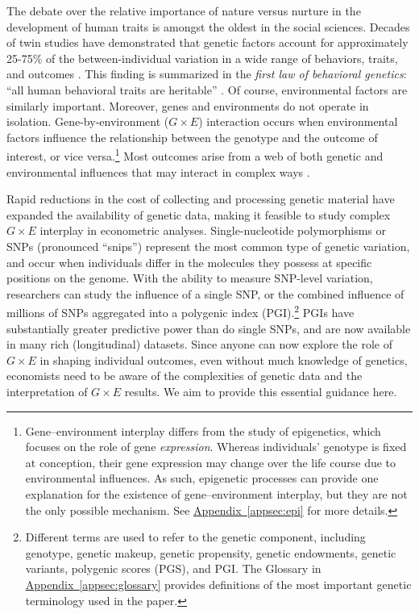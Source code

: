 \documentclass[12pt,a4paper]{article}
\begin{document}
\begin{bibunit}
The debate over the relative importance of nature versus nurture in the development of human traits is amongst the oldest in the social sciences. Decades of twin studies have demonstrated that genetic factors account for approximately 25-75\% of the between-individual variation in a wide range of behaviors, traits, and outcomes \citep{Polderman2015}.  This finding is summarized in the \textit{first law of behavioral genetics}: ``all human behavioral traits are heritable'' \citep{Turkheimer2000}. Of course, environmental factors are similarly important.  Moreover, genes and environments do not operate in isolation.  Gene-by-environment ($G \times E$) interaction occurs when environmental factors influence the relationship between the genotype and the outcome of interest, or vice versa.\footnote{Gene--environment interplay differs from the study of epigenetics, which focuses on the role of gene \textit{expression}. Whereas individuals' genotype is fixed at conception, their gene expression may change over the life course due to environmental influences. As such, epigenetic processes can provide one explanation for the existence of gene--environment interplay, but they are not the only possible mechanism. See \hyperref[appsec:epi]{Appendix~\ref*{appsec:epi}} for more details.}    Most outcomes arise from a web of both genetic and environmental influences that may interact in complex ways \citep{Hunter2005, Heckman2007}.

Rapid reductions in the cost of collecting and processing genetic material have expanded the availability of genetic data, making it feasible to study complex $G \times E$ interplay in econometric analyses.  Single-nucleotide polymorphisms or SNPs (pronounced ``snips'') represent the most common type of genetic variation, and occur when individuals differ in the molecules they possess at specific positions on the genome.  With the ability to measure SNP-level variation, researchers can study the influence of a single SNP, or the combined influence of millions of SNPs aggregated into a polygenic index (PGI).\footnote{Different terms are used to refer to the genetic component, including genotype, genetic makeup, genetic propensity, genetic endowments, genetic variants, polygenic scores (PGS), and PGI. The Glossary in \hyperref[appsec:glossary]{Appendix~\ref*{appsec:glossary}} provides definitions of the most important genetic terminology used in the paper.}  
PGIs have substantially greater predictive power than do single SNPs, and are now available in many rich (longitudinal) datasets. Since anyone can now explore the role of $G \times E$ in shaping individual outcomes, even without much knowledge of genetics, economists need to be aware of the complexities of genetic data and the interpretation of $G \times E$ results.  We aim to provide this essential guidance here.


\end{bibunit}
\end{document}

